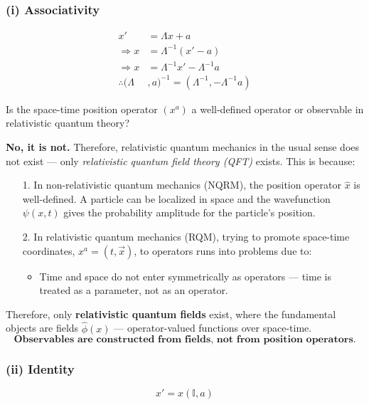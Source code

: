 \documentclass[14pt]{article} %
\begin{document}
\subsubsection*{(i) Associativity}
\vspace{-0.7cm}
\begin{align*}
    x' &= \Lambda x + a \\
    \Rightarrow x &= \Lambda^{-1} (x' - a) \\
    \Rightarrow x &= \Lambda^{-1} x' -  \Lambda^{-1}a \\
    \therefore (\Lambda&, a)^{-1} = (\Lambda^{-1}, -\Lambda^{-1}a) \tag{4.1} \label{eq:4.1}
\end{align*}
\begin{tcolorbox}[proofbox, title=\textbf{Note:}]

Is the space-time position operator $(x^a)$ a well-defined operator or observable in relativistic quantum theory? 

\medskip

\noindent \textbf{No, it is not.} Therefore, relativistic quantum mechanics in the usual sense does not exist — only \textit{relativistic quantum field theory (QFT)} exists. This is because:

\begin{itemize}
    \item [1.] In non-relativistic quantum mechanics (NQRM), the position operator $\hat{x}$ is well-defined. A particle can be localized in space and the wavefunction $\psi(x,t)$ gives the probability amplitude for the particle's position.
    
    \item [2.] In relativistic quantum mechanics (RQM), trying to promote space-time coordinates, $x^a = (t, \vec{x})$, to operators runs into problems due to:    
    \begin{itemize}
        \item Time and space do not enter symmetrically as operators — time is treated as a parameter, not as an operator.
    \end{itemize}
\end{itemize}

\noindent Therefore, only \textbf{relativistic quantum fields} exist, where the fundamental objects are fields $\hat{\phi}(x)$ — operator-valued functions over space-time.
$$\textbf{Observables are constructed from fields, not from position operators.}$$
\end{tcolorbox}

\subsubsection*{(ii) Identity}
\vspace{-0.7cm}
\[
x' = x(\mathbb{I},a)
\]
\end{document}
